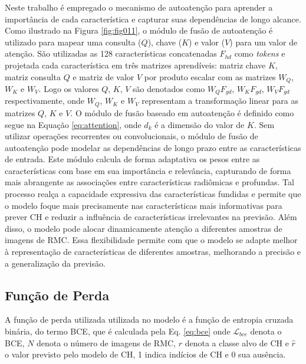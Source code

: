 Neste trabalho é empregado o mecanismo de autoatenção para aprender a importância de cada característica e capturar suas dependências de longo alcance. Como ilustrado na Figura \ref{fig:fig011}, o módulo de fusão de autoatenção é utilizado para mapear uma consulta ($Q$), chave ($K$) e valor ($V$) para um valor de atenção. São utilizadas as 128 características concatenadas $F_{hd}$  como \textit{tokens} e projetada cada característica em três matrizes aprendíveis: matriz chave $K$, matriz consulta $Q$ e matriz de valor $V$ por produto escalar com as matrizes $W_{Q}$, $W_{K}$ e $W_{V}$. Logo os valores $Q$, $K$, $V$ são denotados como $W_{Q}F_{gd}$, $W_{K}F_{gd}$, $W_{V}F_{gd}$ respectivamente, onde $W_{Q}$, $W_{K}$ e $W_{V}$ representam a transformação linear para as matrizes $Q$, $K$ e $V$. O módulo de fusão baseado em autoatenção é definido como segue na Equação \ref{eq:attention}, onde $d_{k}$ é a dimensão do valor de $K$. Sem utilizar operações recorrentes ou convolucionais, o módulo de fusão de autoatenção pode modelar as dependências de longo prazo entre as características de entrada.      Este módulo calcula de forma adaptativa os pesos entre as características com base em sua importância e relevância, capturando de forma mais abrangente as associações entre características radiômicas e profundas. Tal processo realça a capacidade expressiva das características fundidas e permite que o modelo foque mais precisamente nas características mais informativas para prever \gls{CH} e reduzir a influência de características irrelevantes na previsão. Além disso, o modelo pode alocar dinamicamente atenção a diferentes amostras de imagens de \gls{RMC}. Essa flexibilidade permite com que o modelo se adapte melhor à representação de características de diferentes amostras, melhorando a precisão e a generalização da previsão.

\subsection{Função de Perda}
\label{subsec:cap4_funcao_perda}

A função de perda utilizada utilizada no modelo é a função de entropia cruzada binária, do termo  \gls{BCE}, que é calculada pela Eq. \ref{eq:bce} onde $\mathcal{L}_{bce}$ denota o \gls{BCE}, $N$ denota o número de imagens de \gls{RMC}, $r$ denota a classe alvo de \gls{CH} e $\hat{r}$ o valor previsto pelo modelo de \gls{CH}, 1 indica indícios de \gls{CH} e 0 sua ausência.

